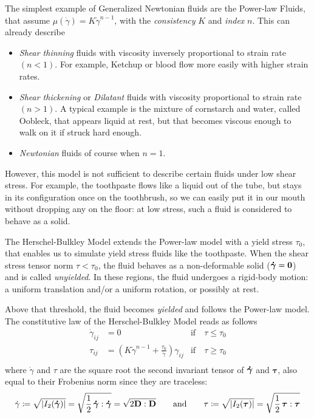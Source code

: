 \documentclass[11 pt]{report}
\begin{document}
The simplest example of Generalized Newtonian fluids are the Power-law Fluids, that assume $\mu(\dot\gamma) = K \dot \gamma^{n-1}$, with the \textit{consistency} $K$ and \textit{index} $n$. This can already describe
\begin{itemize}[label=---, topsep=0pt]
    \setlength{\itemsep}{0pt}
    \item\textit{Shear thinning} fluids with viscosity inversely proportional to strain rate $(n<1)$. For example, Ketchup or blood flow more easily with higher strain rates.
    \item\textit{Shear thickening} or \textit{Dilatant} fluids with viscosity proportional to strain rate $(n>1)$. A typical example is the mixture of cornstarch and water, called Oobleck, that appears liquid at rest, but that becomes viscous enough to walk on it if struck hard enough.
    \item \textit{Newtonian} fluids of course when $n=1$.
\end{itemize}

However, this model is not sufficient to describe certain fluids under low shear stress. For example, the toothpaste flows like a liquid out of the tube, but stays in its configuration once on the toothbrush, so we can easily put it in our mouth without dropping any on the floor: at low stress, such a fluid is considered to behave as a solid.

The Herschel-Bulkley Model extends the Power-law model with a yield stress $\tau_0$, that enables us to simulate yield stress fluids like the toothpaste. When the shear stress tensor norm $\tau < \tau_0$, the fluid behaves as a non-deformable solid ($\boldsymbol{\dot \gamma}=\mathbf{0}$) and is called \textit{unyielded}. In these regions, the fluid undergoes a rigid-body motion: a uniform translation and/or a uniform rotation, or possibly at rest.

Above that threshold, the fluid becomes \textit{yielded} and follows the Power-law model. The constitutive law of the Herschel-Bulkley Model reads as follows
\begin{equation}
    \begin{aligned}
        \dot \gamma_{ij} &= 0 & \text{if} \quad \tau \leq \tau_0\\
        \tau_{ij} &= \left(K \dot \gamma^{n-1} + \frac{\tau_0}{\dot \gamma}\right) \gamma_{ij} & \text{if} \quad \tau \geq \tau_0\\
    \end{aligned}
    \label{eq:herschel}
\end{equation}
where $\dot \gamma$ and $\tau$ are the square root the second invariant tensor of $\boldsymbol{\dot \gamma}$ and $\boldsymbol\tau$, also equal to their Frobenius norm since they are traceless:
\begin{equation}
    \dot \gamma \coloneqq \sqrt{|I_2(\boldsymbol{\dot \gamma})|} = \sqrt{\frac{1}{2} \, \boldsymbol{\dot \gamma} : \boldsymbol{\dot \gamma}} = \sqrt{2 \mathbf{D} : \mathbf{D}} \qquad\text{and}\qquad
    \tau \coloneqq \sqrt{|I_2(\boldsymbol\tau)|} = \sqrt{\frac{1}{2} \, \boldsymbol\tau : \boldsymbol\tau}
    \label{eq:tensornorm}
\end{equation}
\end{document}
